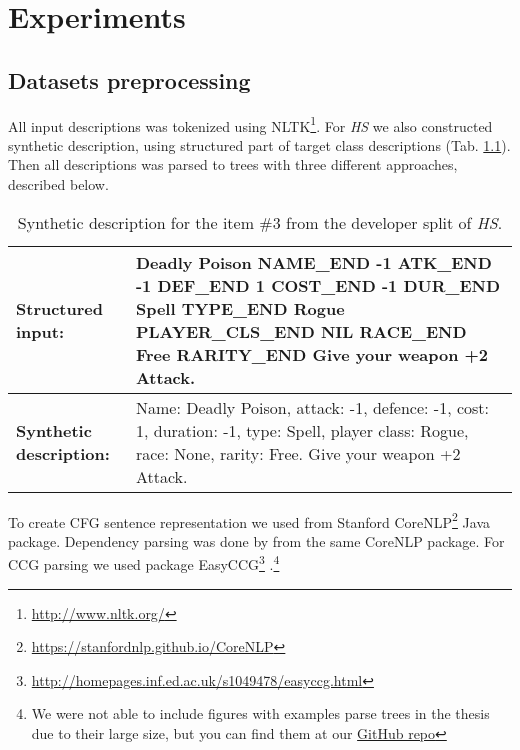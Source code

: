 \chapter{Experiments} \label{Chapter5} 

\section{Datasets preprocessing} \label{preprocessing}

All input descriptions was tokenized using NLTK\footnote{\href{http://www.nltk.org/}{http://www.nltk.org/}}. For \emph{HS} we also constructed synthetic description, using structured part of target class descriptions (Tab. \ref{table:hs_input}). Then all descriptions was parsed to trees with three different approaches, described below.

\begin{table}[h]
\begin{tabularx}{\textwidth}{ l X }
\hline
\textbf{Structured input:} & Deadly Poison NAME\_END -1 ATK\_END -1 DEF\_END 1 COST\_END -1 DUR\_END Spell TYPE\_END Rogue PLAYER\_CLS\_END NIL RACE\_END Free RARITY\_END Give your weapon +2 Attack. \\
\hline 
\textbf{Synthetic description:} & Name: Deadly Poison, attack: -1, defence: -1, cost: 1, duration: -1, type: Spell, player class: Rogue, race: None, rarity: Free. Give your weapon +2 Attack. \\
\hline
\end{tabularx}
\caption{Synthetic description for the item \#3 from the developer split of \emph{HS}.}
\label{table:hs_input}
\end{table}

To create CFG sentence representation we used  \parencite{klein2003} from Stanford CoreNLP\footnote{\href{https://stanfordnlp.github.io/CoreNLP}{https://stanfordnlp.github.io/CoreNLP}} Java package. Dependency parsing was done by  \parencite{chen2014} from the same CoreNLP package. For CCG parsing we used package EasyCCG\footnote{\href{http://homepages.inf.ed.ac.uk/s1049478/easyccg.html}{http://homepages.inf.ed.ac.uk/s1049478/easyccg.html}} \parencite{lewis2014}.\footnote{We were not able to include figures with examples parse trees in the thesis due to their large size, but you can find them at our \href{https://github.com/tsdaemon/treelstm-code-generation/tree/master/pictures}{GitHub repo}}


